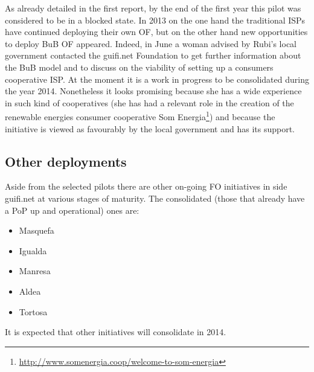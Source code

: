 As already detailed in the first report, by the end of the first year this pilot was considered to be in a blocked state. In 2013 on the one hand the traditional ISPs have continued deploying their own OF, but on the other hand new opportunities to deploy BuB OF appeared. Indeed, in June a woman advised by Rubi's local government contacted the guifi.net Foundation to get further information about the BuB model and to discuss on the viability of setting up a consumers cooperative ISP. At the moment it is a work in progress to be consolidated during the year 2014. Nonetheless it looks promising because she has a wide experience in such kind of cooperatives (she has had a relevant role in the creation of the renewable energies consumer cooperative Som Energia\footnote{\url{http://www.somenergia.coop/welcome-to-som-energia}}) and because the initiative is viewed as favourably by the local government and has its support.


\FloatBarrier
\subsection{Other deployments}
\label{dep_other}

Aside from the selected pilots there are other on-going FO initiatives in side guifi.net at various stages of maturity. The consolidated (those that already have a PoP up and operational) ones are:

\begin{itemize}
\item Masquefa
\item Igualda
\item Manresa
\item Aldea
\item Tortosa
\end{itemize}

It is expected that other initiatives will consolidate in 2014.